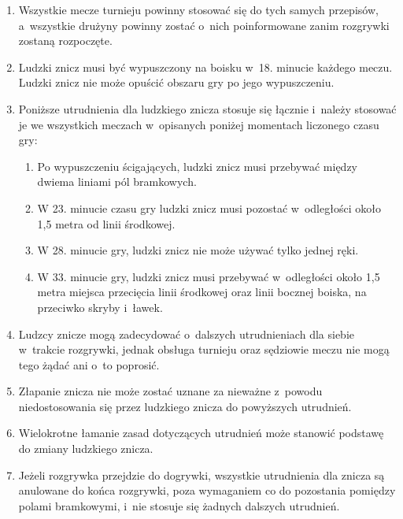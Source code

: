 \documentclass[12pt]{article}
\begin{document}
\begin{enumerate}
	\item Wszystkie mecze turnieju powinny stosować się do tych samych
	      przepisów, a~wszystkie drużyny powinny zostać o~nich poinformowane zanim
	      rozgrywki zostaną rozpoczęte.

	\item Ludzki znicz musi być wypuszczony na boisku w~18. minucie każdego
	      meczu. Ludzki znicz nie może opuścić obszaru gry po jego wypuszczeniu.

	\item Poniższe utrudnienia dla ludzkiego znicza stosuje się łącznie i~należy stosować je we wszystkich meczach w~opisanych poniżej momentach
	      liczonego czasu gry:
	      \begin{enumerate}
		      \item Po wypuszczeniu ścigających, ludzki znicz musi przebywać między
		            dwiema liniami pól bramkowych.

		      \item W 23. minucie czasu gry ludzki znicz musi pozostać w~odległości
		            około 1,5 metra od linii środkowej.

		      \item W 28. minucie gry, ludzki znicz nie może używać tylko jednej ręki.

		      \item W 33. minucie gry, ludzki znicz musi przebywać w~odległości około
		            1,5 metra miejsca przecięcia linii środkowej oraz linii bocznej boiska,
		            na przeciwko skryby i~ławek.
	      \end{enumerate}

	\item Ludzcy znicze mogą zadecydować o~dalszych utrudnieniach dla siebie w~trakcie rozgrywki, jednak obsługa turnieju oraz sędziowie meczu nie mogą
	      tego żądać ani o~to poprosić.

	\item Złapanie znicza nie może zostać uznane za nieważne z~powodu
	      niedostosowania się przez ludzkiego znicza do powyższych utrudnień.

	\item Wielokrotne łamanie zasad dotyczących utrudnień może stanowić
	      podstawę do zmiany ludzkiego znicza.

	\item Jeżeli rozgrywka przejdzie do dogrywki, wszystkie utrudnienia dla
	      znicza są anulowane do końca rozgrywki, poza wymaganiem co do pozostania
	      pomiędzy polami bramkowymi, i~nie stosuje się żadnych dalszych
	      utrudnień.


\end{enumerate}
\end{document}
